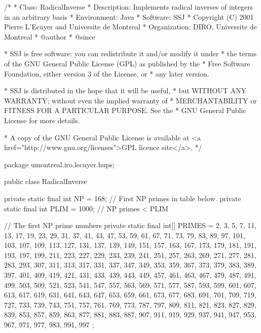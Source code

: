 \begin{code}
\begin{hide}
/*
 * Class:        RadicalInverse
 * Description:  Implements radical inverses of integers in an arbitrary basis
 * Environment:  Java
 * Software:     SSJ 
 * Copyright (C) 2001  Pierre L'Ecuyer and Universite de Montreal
 * Organization: DIRO, Universite de Montreal
 * @author       
 * @since

 * SSJ is free software: you can redistribute it and/or modify it under
 * the terms of the GNU General Public License (GPL) as published by the
 * Free Software Foundation, either version 3 of the License, or
 * any later version.

 * SSJ is distributed in the hope that it will be useful,
 * but WITHOUT ANY WARRANTY; without even the implied warranty of
 * MERCHANTABILITY or FITNESS FOR A PARTICULAR PURPOSE.  See the
 * GNU General Public License for more details.

 * A copy of the GNU General Public License is available at
   <a href="http://www.gnu.org/licenses">GPL licence site</a>.
 */
\end{hide}
package umontreal.iro.lecuyer.hups;


public class RadicalInverse \begin{hide} {
   private static final int NP = 168;     // First NP primes in table below.
   private static final int PLIM = 1000;  // NP primes < PLIM

   // The first NP prime numbers
   private static final int[] PRIMES = { 
    2, 3, 5, 7, 11, 13, 17, 19, 23, 29, 31, 37, 41, 43, 47, 53, 59, 61, 67,
    71, 73, 79, 83, 89, 97, 101, 103, 107, 109, 113, 127, 131, 137, 139, 
    149, 151, 157, 163, 167, 173, 179, 181, 191, 193, 197, 199, 211, 223, 
    227, 229, 233, 239, 241, 251, 257, 263, 269, 271, 277, 281, 283, 293, 
    307, 311, 313, 317, 331, 337, 347, 349, 353, 359, 367, 373, 379, 383, 
    389, 397, 401, 409, 419, 421, 431, 433, 439, 443, 449, 457, 461, 463, 
    467, 479, 487, 491, 499, 503, 509, 521, 523, 541, 547, 557, 563, 569, 
    571, 577, 587, 593, 599, 601, 607, 613, 617, 619, 631, 641, 643, 647, 
    653, 659, 661, 673, 677, 683, 691, 701, 709, 719, 727, 733, 739, 743, 
    751, 757, 761, 769, 773, 787, 797, 809, 811, 821, 823, 827, 829, 839, 
    853, 857, 859, 863, 877, 881, 883, 887, 907, 911, 919, 929, 937, 941, 
    947, 953, 967, 971, 977, 983, 991, 997 };

}
\end{hide}
\end{code}
